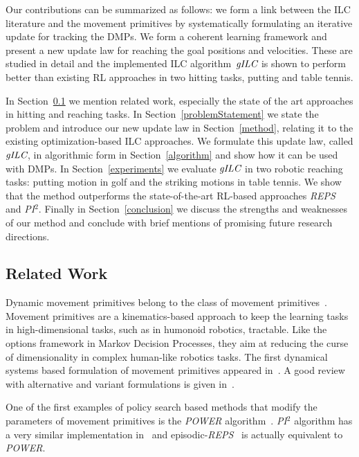 Our contributions can be summarized as follows: we form a link between the ILC literature and the movement primitives by systematically formulating an iterative update for tracking the DMPs. We form a coherent learning framework and present a new update law for reaching the goal positions and velocities. These are studied in detail and the implemented ILC algorithm~$\emph{gILC}$ is shown to perform better than existing RL approaches in two hitting tasks, putting and table tennis.

In Section~\ref{relatedWork} we mention related work, especially the state of the art approaches in hitting and reaching tasks. In Section~\ref{problemStatement} we state the problem and introduce our new update law in Section~\ref{method}, relating it to the existing optimization-based ILC approaches. We formulate this update law, called $\emph{gILC}$, in algorithmic form in Section~\ref{algorithm} and show how it can be used with DMPs. In Section~\ref{experiments} we evaluate $\emph{gILC}$ in two robotic reaching tasks: putting motion in golf and the striking motions in table tennis. We show that the method outperforms the state-of-the-art RL-based approaches \emph{REPS} and \emph{PI$^{2}$}. Finally in Section~\ref{conclusion} we discuss the strengths and weaknesses of our method and conclude with brief mentions of promising future research directions.

\subsection{Related Work}\label{relatedWork}

Dynamic movement primitives belong to the class of movement primitives~\cite{Flash85}. Movement primitives are a kinematics-based approach to keep the learning tasks in high-dimensional tasks, such as in humonoid robotics, tractable. Like the options framework in Markov Decision Processes, they aim at reducing the curse of dimensionality in complex human-like robotics tasks. The first dynamical systems based formulation of movement primitives appeared in~\cite{Ijspeert02}. A good review with alternative and variant formulations is given in~\cite{Ijspeert13}.

One of the first examples of policy search based methods that modify the parameters of movement primitives is the \emph{POWER} algorithm~\cite{Kober08}. \emph{PI$^{2}$} algorithm has a very similar implementation in~\cite{Theodorou10} and episodic-\emph{REPS}~\cite{Peter10} is actually equivalent to \emph{POWER}.

